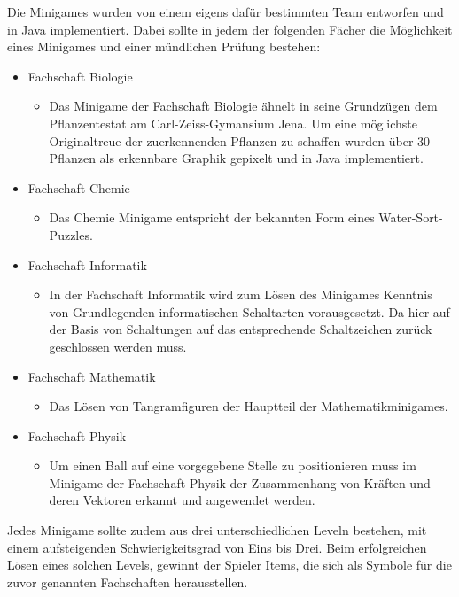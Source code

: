 Die Minigames wurden von einem eigens dafür bestimmten Team entworfen und in Java implementiert. 
Dabei sollte in jedem der folgenden Fächer die Möglichkeit eines Minigames und einer mündlichen Prüfung bestehen:
\begin{itemize}
    \item Fachschaft Biologie
        \begin{itemize}
        \item Das Minigame der Fachschaft Biologie ähnelt in seine Grundzügen dem Pflanzentestat am Carl-Zeiss-Gymansium Jena. Um eine möglichste Originaltreue der zuerkennenden Pflanzen zu schaffen wurden über 30 Pflanzen als erkennbare Graphik gepixelt und in Java implementiert.
        \end{itemize}
    \item Fachschaft Chemie
        \begin{itemize}
        \item Das Chemie Minigame entspricht der bekannten Form eines Water-Sort-Puzzles.
        \end{itemize}
    \item Fachschaft Informatik
        \begin{itemize}
        \item In der Fachschaft Informatik wird zum Lösen des Minigames Kenntnis von Grundlegenden informatischen Schaltarten vorausgesetzt. Da hier auf der Basis von Schaltungen auf das entsprechende Schaltzeichen zurück geschlossen werden muss.
        \end{itemize}
    \item Fachschaft Mathematik
        \begin{itemize}
        \item Das Lösen von Tangramfiguren der Hauptteil der Mathematikminigames.
        \end{itemize}
    \item Fachschaft Physik
        \begin{itemize}
        \item Um einen Ball auf eine vorgegebene Stelle zu positionieren muss im Minigame der Fachschaft Physik der Zusammenhang von Kräften und deren Vektoren erkannt und angewendet werden. 
        \end{itemize}
\end{itemize}

Jedes Minigame sollte zudem aus drei unterschiedlichen Leveln bestehen, mit einem aufsteigenden Schwierigkeitsgrad von Eins bis Drei. Beim erfolgreichen Lösen eines solchen Levels, gewinnt der Spieler Items, die sich als Symbole für die zuvor genannten Fachschaften herausstellen.

